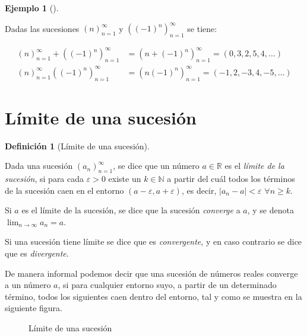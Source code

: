 \documentclass[
  a4paper,
]{scrreport}
\theoremstyle{definition}
\newtheorem{definition}{Definición}[chapter]
\theoremstyle{plain}
\theoremstyle{plain}
\theoremstyle{definition}
\theoremstyle{definition}
\newtheorem{example}{Ejemplo}[chapter]
\theoremstyle{plain}
\theoremstyle{remark}
\begin{document}
\begin{example}[]\protect\hypertarget{exm-operaciones-sucesiones}{}\label{exm-operaciones-sucesiones}

Dadas las sucesiones \((n)_{n=1}^\infty\) y \(((-1)^n)_{n=1}^\infty\) se
tiene:

\begin{align*}
(n)_{n=1}^\infty + ((-1)^n)_{n=1}^\infty &= (n + (-1)^n)_{n=1}^\infty = (0, 3, 2, 5, 4, \ldots)\\
(n)_{n=1}^\infty ((-1)^n)_{n=1}^\infty &= (n (-1)^n)_{n=1}^\infty = (-1, 2, -3, 4, -5, \ldots)
\end{align*}

\end{example}

\hypertarget{luxedmite-de-una-sucesiuxf3n}{%
\section{Límite de una sucesión}\label{luxedmite-de-una-sucesiuxf3n}}

\begin{definition}[Límite de una
sucesión]\protect\hypertarget{def-limite-sucesion}{}\label{def-limite-sucesion}

Dada una sucesión \((a_n)_{n=1}^\infty\), se dice que un número
\(a\in\mathbb{R}\) es el \emph{límite de la sucesión}, si para cada
\(\varepsilon>0\) existe un \(k\in\mathbb{N}\) a partir del cuál todos
los términos de la sucesión caen en el entorno
\((a-\varepsilon, a+\varepsilon)\), es decir, \(|a_n-a|<\varepsilon\)
\(\forall n\geq k\).

Si \(a\) es el límite de la sucesión, se dice que la sucesión
\emph{converge} a \(a\), y se denota \(\lim_{n\to\infty}a_n = a\).

\end{definition}

Si una sucesión tiene límite se dice que es \emph{convergente}, y en
caso contrario se dice que es \emph{divergente}.

De manera informal podemos decir que una sucesión de números reales
converge a un número \(a\), si para cualquier entorno suyo, a partir de
un determinado término, todos los siguientes caen dentro del entorno,
tal y como se muestra en la siguiente figura.

\begin{figure}

{\centering 



}

\caption{Límite de una sucesión}

\end{figure}
\end{document}
